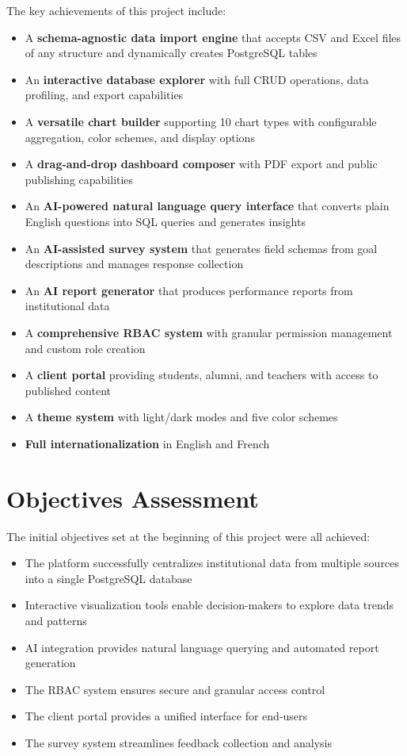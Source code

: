 \documentclass[12pt,a4paper]{report}
\begin{document}
The key achievements of this project include:
\begin{itemize}
    \item A \textbf{schema-agnostic data import engine} that accepts CSV and Excel files of any structure and dynamically creates PostgreSQL tables
    \item An \textbf{interactive database explorer} with full CRUD operations, data profiling, and export capabilities
    \item A \textbf{versatile chart builder} supporting 10 chart types with configurable aggregation, color schemes, and display options
    \item A \textbf{drag-and-drop dashboard composer} with PDF export and public publishing capabilities
    \item An \textbf{AI-powered natural language query interface} that converts plain English questions into SQL queries and generates insights
    \item An \textbf{AI-assisted survey system} that generates field schemas from goal descriptions and manages response collection
    \item An \textbf{AI report generator} that produces performance reports from institutional data
    \item A \textbf{comprehensive RBAC system} with granular permission management and custom role creation
    \item A \textbf{client portal} providing students, alumni, and teachers with access to published content
    \item A \textbf{theme system} with light/dark modes and five color schemes
    \item \textbf{Full internationalization} in English and French
\end{itemize}

\section*{Objectives Assessment}

The initial objectives set at the beginning of this project were all achieved:
\begin{itemize}
    \item The platform successfully centralizes institutional data from multiple sources into a single PostgreSQL database
    \item Interactive visualization tools enable decision-makers to explore data trends and patterns
    \item AI integration provides natural language querying and automated report generation
    \item The RBAC system ensures secure and granular access control
    \item The client portal provides a unified interface for end-users
    \item The survey system streamlines feedback collection and analysis
\end{itemize}
\end{document}
